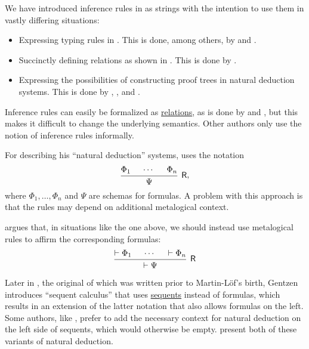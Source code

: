 \begin{remark}\label{rem:inference_rules_semantics}
  We have introduced inference rules in  as strings with the intention to use them in vastly differing situations:
  \begin{itemize}
    \item Expressing typing rules in . This is done, among others, by  and .
    \item Succinctly defining relations as shown in . This is done by .
    \item Expressing the possibilities of constructing proof trees in natural deduction systems. This is done by , ,  and .
  \end{itemize}

  Inference rules can easily be formalized as \hyperref[def:relation]{relations}, as is done by  and , but this makes it difficult to change the underlying semantics. Other authors only use the notion of inference rules informally.

  For describing his \enquote{natural deduction} systems,  uses the notation
  \begin{equation*}
    \begin{prooftree}
      \hypo{ \Phi_1 }
      \hypo{ \cdots }
      \hypo{ \Phi_n }
      \infer3[\logic{R}]{ \Psi }
    \end{prooftree},
  \end{equation*}
  where \( \Phi_1, \ldots, \Phi_n \) and \( \Psi \) are schemas for formulas. A problem with this approach is that the rules may depend on additional metalogical context.

   argues that, in situations like the one above, we should instead use metalogical rules to affirm the corresponding formulas:
  \begin{equation*}
    \begin{prooftree}
      \hypo{ \vdash \Phi_1 }
      \hypo{ \cdots }
      \hypo{ \vdash \Phi_n }
      \infer3[\logic{R}]{ \vdash \Psi }
    \end{prooftree}
  \end{equation*}

  Later in \cite{Szabo1964Gentzen}, the original of which was written prior to Martin-L\"of's birth, Gentzen introduces \enquote{sequent calculus} that uses \hyperref[def:sequent]{sequents} instead of formulas, which results in an extension of the latter notation that also allows formulas on the left. Some authors, like , prefer to add the necessary context for natural deduction on the left side of sequents, which would otherwise be empty.  present both of these variants of natural deduction.


\end{remark}
